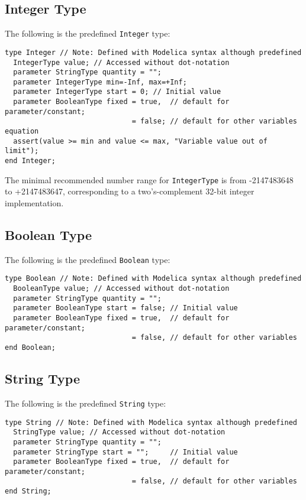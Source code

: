 \subsection{Integer Type}\label{integer-type}
The following is the predefined \lstinline!Integer! type:
\begin{lstlisting}[language=modelica]
type Integer // Note: Defined with Modelica syntax although predefined
  IntegerType value; // Accessed without dot-notation
  parameter StringType quantity = "";
  parameter IntegerType min=-Inf, max=+Inf;
  parameter IntegerType start = 0; // Initial value
  parameter BooleanType fixed = true,  // default for parameter/constant;
                              = false; // default for other variables
equation
  assert(value >= min and value <= max, "Variable value out of limit");
end Integer;
\end{lstlisting}

The minimal recommended number range for \lstinline!IntegerType! is from -2147483648 to +2147483647, corresponding to a two's-complement 32-bit integer implementation.

\subsection{Boolean Type}\label{boolean-type}
The following is the predefined \lstinline!Boolean! type:
\begin{lstlisting}[language=modelica]
type Boolean // Note: Defined with Modelica syntax although predefined
  BooleanType value; // Accessed without dot-notation
  parameter StringType quantity = "";
  parameter BooleanType start = false; // Initial value
  parameter BooleanType fixed = true,  // default for parameter/constant;
                              = false, // default for other variables
end Boolean;
\end{lstlisting}

\subsection{String Type}\label{string-type}

The following is the predefined \lstinline!String! type:
\begin{lstlisting}[language=modelica]
type String // Note: Defined with Modelica syntax although predefined
  StringType value; // Accessed without dot-notation
  parameter StringType quantity = "";
  parameter StringType start = "";     // Initial value
  parameter BooleanType fixed = true,  // default for parameter/constant;
                              = false, // default for other variables
end String;
\end{lstlisting}

